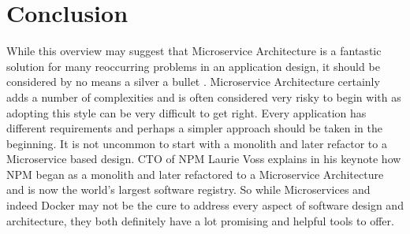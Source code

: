 \section{Conclusion}
While this overview may suggest that Microservice Architecture is a fantastic solution for many reoccurring problems in an application design, it should be considered by no means a silver a bullet \cite{BuildingMicroServices}. Microservice Architecture certainly adds a number of complexities and is often considered very risky to begin with as adopting this style can be very difficult to get right. Every application has different requirements and perhaps a simpler approach should be taken in the beginning. It is not uncommon to start with a monolith and later refactor to a Microservice based design. CTO of NPM Laurie Voss explains in his keynote how NPM began as a monolith and later refactored to a Microservice Architecture and is now the world's largest software registry\cite{npm}. So while Microservices and indeed Docker may not be the cure to address every aspect of software design and architecture, they both definitely have a lot promising and helpful tools to offer.

